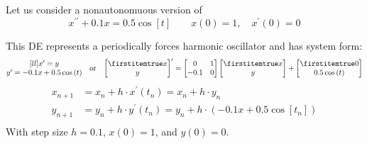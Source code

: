 \documentclass{beamer}
\begin{document}
\begin{frame}[fragile]
\begin{example}
Let us consider a nonautonomuous version of
\begin{equation*}
x^{\prime\prime}+0.1x=0.5\cos[t]
\qquad
x(0)=1,\quad x^\prime(0)=0
\end{equation*}
\begin{overprint}
This DE represents a periodically forces harmonic oscillator and has system form:
\begin{equation*}
\begin{matrix}[ll]
x^\prime=y \\
y^\prime=-0.1x+0.5\cos[t]
\end{matrix}
\quad\text{or}\quad
{\bvector{x,y}}^\prime=
\begin{bmatrix}
0 & 1 \\
-0.1 & 0 \\
\end{bmatrix}
\bvector{x,y}+\bvector{0,0.5\cos[t]}
\end{equation*}
\vspace{-2mm}
\begin{equation*}
\begin{aligned}
x_{n+1}&=x_n+h\cdot x^\prime(t_n) = x_n+h\cdot y_n\\
y_{n+1}&=y_n+h\cdot y^\prime(t_n) = y_n+h\cdot (-0.1x+0.5\cos[t_n])\\
\end{aligned}
\end{equation*}
With step size $h=0.1$, $x(0)=1$, and $y(0)=0$.


\end{overprint}
\end{example}
\end{frame}
\end{document}
